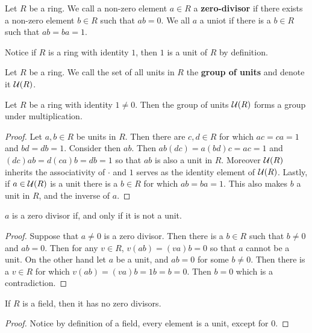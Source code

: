 \begin{definition}
  Let $R$ be a ring. We call a non-zero element $a \in R$ a
  \textbf{zero-divisor} if there exists a non-zero element $b \in R$
  such that $ab=0$. We all $a$ a uniot if there is a $b \in R$ such
  that $ab=ba=1$.
\end{definition}

\begin{example}\label{example_5.2}
  Notice if $R$ is a ring with identity $1$, then $1$ is a unit of $R$ by
  definition.
\end{example}

\begin{definition}
  Let $R$ be a ring. We call the set of all units in  $R$ the \textbf{group
  of units} and denote it $\mathcal{U}(R)$.
\end{definition}

\begin{lemma}\label{lemma_5.1.2}
  Let $R$ be a ring with identity $1 \neq 0$. Then the group of units
  $\mathcal{U}(R)$ forms a group under multiplication.
\end{lemma}
\begin{proof}
  Let $a,b \in R$ be units in $R$. Then there are $c,d \in R$ for which
  $ac=ca=1$ and  $bd=db=1$. Consider then $ab$. Then  $ab(dc)=a(bd)c=ac=1$ and
  $(dc)ab=d(ca)b=db=1$ so that $ab$ is also a unit in $R$. Moreover $\mathcal{U}{(R)}$
  inherits the associativity of  $\cdot$ and $1$ serves as the identity
  element of $\mathcal{U}{(R)}$. Lastly, if $a \in \mathcal{U}{(R)}$ is a unit there is a $b
  \in R$ for which $ab=ba=1$. This also makes $b$ a unit in $R$, and the
  inverse of $a$.
\end{proof}
\begin{corollary}
  $a$ is a zero divisor if, and only if it is not a unit.
\end{corollary}

\begin{proof}
  Suppose that $a \neq 0$ is a zero divisor. Then there is a  $b \in R$ such
  that $b \neq 0$ and $ab=0$. Then for any $v \in R$,  $v(ab)=(va)b=0$ so that
  $a$ cannot be a unit. On the other hand let  $a$ be a unit, and  $ab=0$ for
  some  $b \neq 0$. Then there is a  $v \in R$ for which
  $v(ab)=(va)b=1b=b=0$. Then $b=0$ which is a contradiction.
\end{proof}
\begin{corollary}
  If $R$ is a field, then it has no zero divisors.
\end{corollary}
\begin{proof}
  Notice by definition of a field, every element is a unit, except for $0$.
\end{proof}

